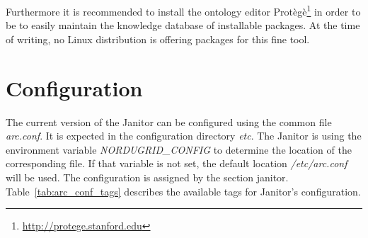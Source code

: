 Furthermore it is recommended to install the ontology editor 
Prot\`eg\`e\footnote{\href{http://protege.stanford.edu}{http://protege.stanford.edu}} in order to be to easily maintain the 
knowledge database of installable packages. At the time of writing, no Linux distribution is offering packages for this fine tool.


\section{Configuration}\label{sec:janitor_configuration}

The current version of the Janitor can be configured using the common file \textit{arc.conf}. It is expected in the 
configuration directory \textit{etc}. The Janitor is using the environment variable \textit{NORDUGRID\_CONFIG}
to determine the location of the corresponding file. If that variable is not set, the default location \textit{/etc/arc.conf} will be used. 
The configuration is assigned by the section \lbrack janitor\rbrack. Table~\ref{tab:arc_conf_tags} describes the available tags
for Janitor's configuration.

